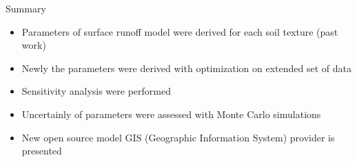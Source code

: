 \begin{alertblock}{Summary}
    {\large
    \begin{itemize}
        \item Parameters of surface runoff model were derived for each soil texture (past work)
        \item Newly the parameters were derived with optimization on extended set of data
        \item Sensitivity analysis were performed 
        \item Uncertainly of parameters were assessed with Monte Carlo simulations 
        \item New open source model GIS (Geographic Information
          System) provider is presented
    \end{itemize}
    }
\end{alertblock}\vspace{0.9cm}





